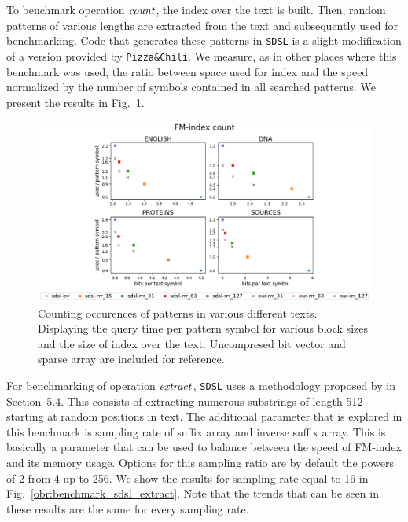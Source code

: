 To benchmark operation $\mathit{count}$, the index over the text is built. Then, random patterns of
various lengths are extracted from the text and subsequently used for benchmarking. Code
that generates these patterns in \texttt{SDSL} is a slight modification of a version provided
by \texttt{Pizza\&Chili}. We measure, as in other places where this benchmark was used, the
ratio between space used for index and the speed normalized by the number of symbols contained
in all searched patterns. We present the results in Fig.~\ref{obr:benchmark_sdsl_count}.

\begin{figure}
	\centerline{
		\includegraphics[width=\textwidth, height=0.4\textheight]{images/vysledky_sdsl_count}
	}
	\caption[TODO]{Counting occurences of patterns in various different texts. Displaying
	the query time per pattern symbol for various block sizes and the size of index over the
	text. Uncompresed bit vector and sparse array are included for reference. 
	}
	\label{obr:benchmark_sdsl_count}
\end{figure}

For benchmarking of operation $\mathit{extract}$, \texttt{SDSL} uses a methodology proposed by
\cite{ferragina2009compressed} in Section~5.4. This consists of extracting numerous
substrings of length 512 starting at random positions in text. The additional parameter
that is explored in this benchmark is sampling rate of suffix array and inverse suffix array.
This is basically a parameter that can be used to balance between the speed of FM-index and
its memory usage. Options for this sampling ratio are by default the powers of 2 from 4 up to
256. We show the results for sampling rate equal to 16 in Fig.~\ref{obr:benchmark_sdsl_extract}.
Note that the trends that can be seen in these results are the same for every sampling rate.


